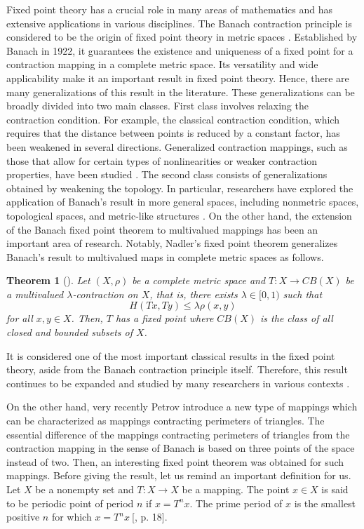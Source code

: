 \documentclass[reqno,11pt]{amsart}
\newtheorem{theorem}{Theorem}
\theoremstyle{plain}
\numberwithin{equation}{section}
\begin{document}
Fixed point theory has a crucial role in many areas of mathematics and has
extensive applications in various disciplines. The Banach contraction
principle is considered to be the origin of fixed point theory in metric
spaces \cite{Banach}. Established by Banach in 1922, it guarantees the
existence and uniqueness of a fixed point for a contraction mapping in a
complete metric space. Its versatility and wide applicability make it an
important result in fixed point theory. Hence, there are many
generalizations of this result in the literature. These generalizations can
be broadly divided into two main classes. First class involves relaxing the
contraction condition. For example, the classical contraction condition,
which requires that the distance between points is reduced by a constant
factor, has been weakened in several directions. Generalized contraction
mappings, such as those that allow for certain types of nonlinearities or
weaker contraction properties, have been studied \cite{B5, B3, B6, B2, B4,
B1}. The second class consists of generalizations obtained by weakening the
topology. In particular, researchers have explored the application of
Banach's result in more general spaces, including nonmetric spaces,
topological spaces, and metric-like structures \cite{T3, T4, T2, T1}. On the
other hand, the extension of the Banach fixed point theorem to multivalued
mappings has been an important area of research. Notably, Nadler's fixed
point theorem generalizes Banach's result to multivalued maps in complete
metric spaces \cite{Nadler} as follows.

\begin{theorem}[\protect \cite{Nadler}]
Let $\left( X,\rho \right) $ be a complete metric space and $T:X\rightarrow
CB(X)$ be a multivalued $\lambda $-contraction on $X$, that is, there exists 
$\lambda \in \lbrack 0,1)$ such that%
\begin{equation}
H\left( Tx,Ty\right) \leq \lambda \rho (x,y)  \label{MLC}
\end{equation}%
for all $x,y\in X$. Then, $T$ has a fixed point where $CB(X)$ is the class
of all closed and bounded subsets of $X$.
\end{theorem}

It is considered one of the most important classical results in the fixed
point theory, aside from the Banach contraction principle itself. Therefore,
this result continues to be expanded and studied by many researchers in
various contexts \cite{N1, N4, JPS, N2, N3}.

On the other hand, very recently Petrov introduce a new type of mappings
which can be characterized as mappings contracting perimeters of triangles.
The essential difference of the mappings contracting perimeters of triangles
from the contraction mapping in the sense of Banach is based on three points
of the space instead of two. Then, an interesting fixed point theorem was
obtained for such mappings. Before giving the result, let us remind an
important definition for us. Let $X$ be a nonempty set and $T:X\rightarrow X$
be a mapping. The point $x\in X$ is said to be periodic point of period $n$
if $x=T^{n}x$. The prime period of $x$ is the smallest positive $n$ for
which $x=T^{n}x~$[\cite{Prime}, p. 18].
\end{document}
